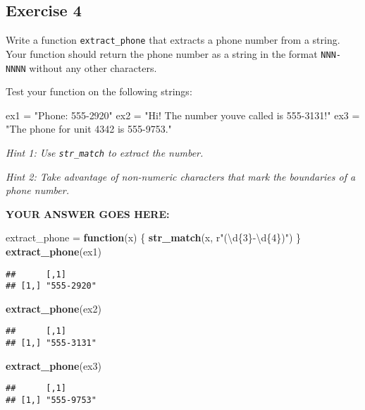 \documentclass[
]{article}
\newenvironment{Shaded}{\begin{snugshade}}{\end{snugshade}}
\newcommand{\ControlFlowTok}[1]{\textcolor[rgb]{0.13,0.29,0.53}{\textbf{#1}}}
\newcommand{\KeywordTok}[1]{\textcolor[rgb]{0.13,0.29,0.53}{\textbf{#1}}}
\newcommand{\NormalTok}[1]{#1}
\newcommand{\StringTok}[1]{\textcolor[rgb]{0.31,0.60,0.02}{#1}}
\begin{document}
\hypertarget{exercise-4}{%
\subsection{Exercise 4}\label{exercise-4}}

Write a function \texttt{extract\_phone} that extracts a phone number
from a string. Your function should return the phone number as a string
in the format \texttt{NNN-NNNN} without any other characters.

Test your function on the following strings:

\begin{Shaded}
\begin{Highlighting}[]
\NormalTok{ex1 =}\StringTok{ "Phone: 555{-}2920"}
\NormalTok{ex2 =}\StringTok{ "Hi! The number you\textquotesingle{}ve called is 555{-}3131!"}
\NormalTok{ex3 =}\StringTok{ "The phone for unit 4342 is 555{-}9753."}
\end{Highlighting}
\end{Shaded}

\emph{Hint 1: Use \texttt{str\_match} to extract the number.}

\emph{Hint 2: Take advantage of non-numeric characters that mark the
boundaries of a phone number.}

\textbf{YOUR ANSWER GOES HERE:}

\begin{Shaded}
\begin{Highlighting}[]
\NormalTok{extract\_phone =}\StringTok{ }\ControlFlowTok{function}\NormalTok{(x) \{}
   \KeywordTok{str\_match}\NormalTok{(x, r}\StringTok{"(\textbackslash{}d\{3\}{-}\textbackslash{}d\{4\})"}\NormalTok{)}
\NormalTok{\}}
\KeywordTok{extract\_phone}\NormalTok{(ex1)}
\end{Highlighting}
\end{Shaded}

\begin{verbatim}
##      [,1]      
## [1,] "555-2920"
\end{verbatim}

\begin{Shaded}
\begin{Highlighting}[]
\KeywordTok{extract\_phone}\NormalTok{(ex2)}
\end{Highlighting}
\end{Shaded}

\begin{verbatim}
##      [,1]      
## [1,] "555-3131"
\end{verbatim}

\begin{Shaded}
\begin{Highlighting}[]
\KeywordTok{extract\_phone}\NormalTok{(ex3)}
\end{Highlighting}
\end{Shaded}

\begin{verbatim}
##      [,1]      
## [1,] "555-9753"
\end{verbatim}
\end{document}

